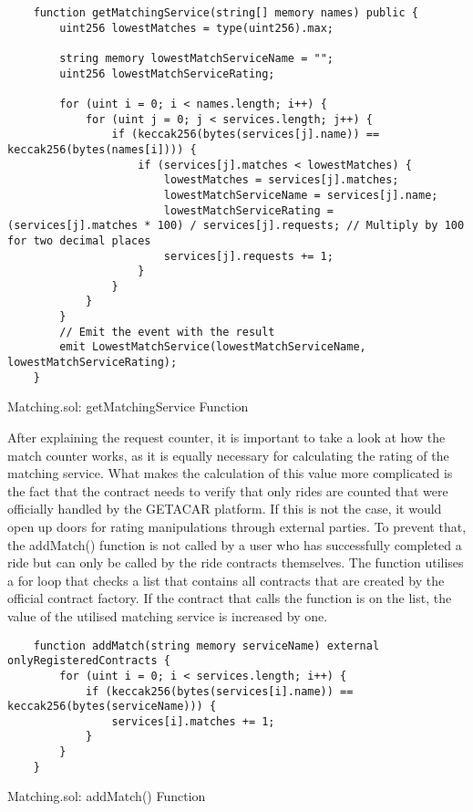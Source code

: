 \begin{Listing}
\begin{lstlisting}
    function getMatchingService(string[] memory names) public {
        uint256 lowestMatches = type(uint256).max;

        string memory lowestMatchServiceName = "";
        uint256 lowestMatchServiceRating;

        for (uint i = 0; i < names.length; i++) {
            for (uint j = 0; j < services.length; j++) {
                if (keccak256(bytes(services[j].name)) == keccak256(bytes(names[i]))) {
                    if (services[j].matches < lowestMatches) {
                        lowestMatches = services[j].matches;
                        lowestMatchServiceName = services[j].name;
                        lowestMatchServiceRating = (services[j].matches * 100) / services[j].requests; // Multiply by 100 for two decimal places
                        services[j].requests += 1;
                    }
                }
            }
        }
        // Emit the event with the result
        emit LowestMatchService(lowestMatchServiceName, lowestMatchServiceRating);
    }
\end{lstlisting}
  \caption{Matching.sol: getMatchingService Function}
  \label{lst:getMatchingService}
\end{Listing}

After explaining the request counter, it is important to take a look at how the match counter works, as it is equally necessary for calculating the rating of the matching service. What makes the calculation of this value more complicated is the fact that the contract needs to verify that only rides are counted that were officially handled by the GETACAR platform. If this is not the case, it would open up doors for rating manipulations through external parties. To prevent that, the addMatch() function is not called by a user who has successfully completed a ride but can only be called by the ride contracts themselves. The function utilises a for loop that checks a list that contains all contracts that are created by the official contract factory. If the contract that calls the function is on the list, the value of the utilised matching service is increased by one.

\lstset{
  basicstyle=\footnotesize\ttfamily,
  breaklines=true,
  numbers=left,
  firstnumber=81
}

\begin{Listing}
\begin{lstlisting}
    function addMatch(string memory serviceName) external onlyRegisteredContracts {
        for (uint i = 0; i < services.length; i++) {
            if (keccak256(bytes(services[i].name)) == keccak256(bytes(serviceName))) {
                services[i].matches += 1;
            }
        }
    }
\end{lstlisting}
  \caption{Matching.sol: addMatch() Function}
  \label{lst:addMatch}
\end{Listing}

